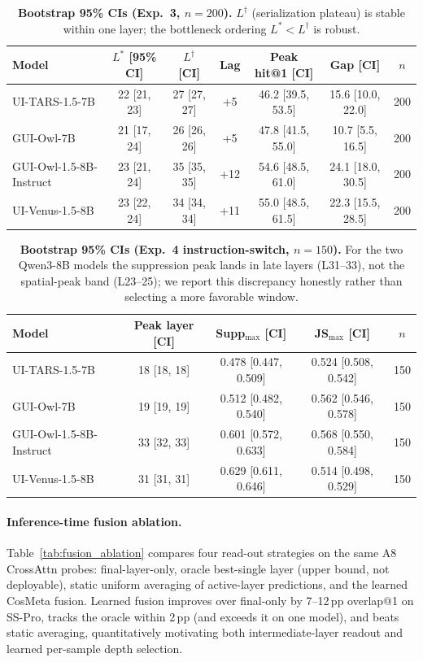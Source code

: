 \begin{table}[!htbp]
\centering\footnotesize\renewcommand{\arraystretch}{0.85}\setlength{\tabcolsep}{3pt}
\begin{tabular}{lcccccc}
\toprule
Model & $L^*$ [95\% CI] & $L^\dagger$ [CI] & Lag & Peak hit@1 [CI] & Gap [CI] & $n$ \\
\midrule
UI-TARS-1.5-7B & 22 [21, 23] & 27 [27, 27] & +5 & 46.2 [39.5, 53.5] & 15.6 [10.0, 22.0] & 200\\
GUI-Owl-7B & 21 [17, 24] & 26 [26, 26] & +5 & 47.8 [41.5, 55.0] & 10.7 [5.5, 16.5] & 200\\
GUI-Owl-1.5-8B-Instruct & 23 [21, 24] & 35 [35, 35] & +12 & 54.6 [48.5, 61.0] & 24.1 [18.0, 30.5] & 200\\
UI-Venus-1.5-8B & 23 [22, 24] & 34 [34, 34] & +11 & 55.0 [48.5, 61.5] & 22.3 [15.5, 28.5] & 200\\
\bottomrule
\end{tabular}
\caption{\textbf{Bootstrap 95\% CIs (Exp.~3, $n{=}200$).} $L^\dagger$ (serialization plateau) is stable within one layer; the bottleneck ordering $L^* < L^\dagger$ is robust.}
\label{tab:bootstrap_ci}
\end{table}

\begin{table}[!htbp]
\centering\footnotesize\renewcommand{\arraystretch}{0.85}\setlength{\tabcolsep}{3pt}
\begin{tabular}{lcccc}
\toprule
Model & Peak layer [CI] & Supp$_{\max}$ [CI] & JS$_{\max}$ [CI] & $n$ \\
\midrule
UI-TARS-1.5-7B & 18 [18, 18] & 0.478 [0.447, 0.509] & 0.524 [0.508, 0.542] & 150\\
GUI-Owl-7B & 19 [19, 19] & 0.512 [0.482, 0.540] & 0.562 [0.546, 0.578] & 150\\
GUI-Owl-1.5-8B-Instruct & 33 [32, 33] & 0.601 [0.572, 0.633] & 0.568 [0.550, 0.584] & 150\\
UI-Venus-1.5-8B & 31 [31, 31] & 0.629 [0.611, 0.646] & 0.514 [0.498, 0.529] & 150\\
\bottomrule
\end{tabular}
\caption{\textbf{Bootstrap 95\% CIs (Exp.~4 instruction-switch, $n{=}150$).} For the two Qwen3-8B models the suppression peak lands in late layers (L31--33), not the spatial-peak band (L23--25); we report this discrepancy honestly rather than selecting a more favorable window.}
\label{tab:bootstrap_ci_exp4}
\end{table}

\paragraph{Inference-time fusion ablation.}
Table~\ref{tab:fusion_ablation} compares four read-out strategies on the same A8
CrossAttn probes: final-layer-only, oracle best-single layer (upper bound, not
deployable), static uniform averaging of active-layer predictions, and the
learned CosMeta fusion. Learned fusion improves over final-only by 7--12\,pp
overlap@1 on SS-Pro, tracks the oracle within 2\,pp (and exceeds it on one
model), and beats static averaging, quantitatively motivating both
intermediate-layer readout and learned per-sample depth selection.

